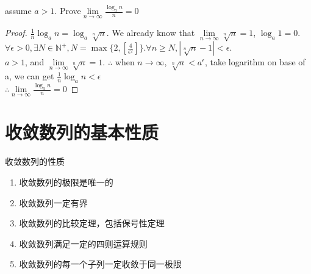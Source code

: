 \begin{qs}
	assume $ a>1 $. Prove$ \lim\limits_{n\rightarrow\infty}\frac{\log_a n}{n} = 0 $
\end{qs}
\begin{proof}
	$\frac{1}{n}\log_a n = \log_a \sqrt[n]{n}$. We already know that $  \lim\limits_{n\rightarrow\infty}\sqrt[n]{n} = 1 $, $ \log_a 1 = 0 $.\\
	$\forall \epsilon >0, \exists N \in \mathbb{N}^+, N = \max\{2,[\frac{4}{\epsilon^2}]\}. \forall n \geqslant N, |\sqrt[n]{n}-1| < \epsilon$.\\
	\color{red}$ a>1 $, and $ \lim\limits_{n\rightarrow\infty}\sqrt[n]{n} = 1 $. $ \therefore  $ when $ n\rightarrow \infty $, $ \sqrt[n]{n}<a^\epsilon $, take logarithm on base of a, we can get $ \frac{1}{n}\log_a {n}<\epsilon $ 	\\
	\color{black}
	$ \therefore \lim\limits_{n\rightarrow\infty} \frac{\log_a n}{n} = 0 $
\end{proof}



\section{收敛数列的基本性质}
\date{2021.5.6}
收敛数列的性质
\begin{enumerate}
	\item 收敛数列的极限是唯一的
	\item 收敛数列一定有界
	\item 收敛数列的比较定理，包括保号性定理
	\item 收敛数列满足一定的四则运算规则
	\item 收敛数列的每一个子列一定收敛于同一极限
\end{enumerate}
